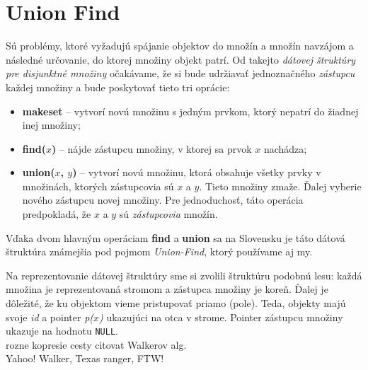 \section{Union Find}
Sú problémy, ktoré vyžadujú spájanie objektov do množín a množín navzájom 
a následné určovanie, do ktorej množiny objekt patrí. Od takejto \emph{
dátovej štruktúry pre disjunktné množiny} očakávame, že si bude udržiavať 
jednoznačného \emph{zástupcu} každej množiny a bude poskytovať 
tieto tri oprácie: 
\begin{itemize}
\item \textbf{makeset} -- vytvorí novú množinu s jedným prvkom, ktorý 
nepatrí do žiadnej inej množiny;
\item \textbf{find($x$)} -- nájde zástupcu množiny, v ktorej sa 
prvok $x$ nachádza;
\item \textbf{union($x$, $y$)} -- vytvorí novú množinu, ktorá obsahuje 
všetky prvky v množinách, ktorých zástupcovia sú $x$ a $y$. Tieto 
množiny zmaže. Ďalej vyberie nového zástupcu novej množiny. Pre 
jednoduchosť, táto operácia predpokladá, že $x$ a $y$ sú 
\emph{zástupcovia} množín.
\end{itemize}
Vďaka dvom hlavným operáciam \textbf{find} a \textbf{union} sa na Slovensku 
je táto dátová štruktúra známejšia pod poj\-mom \emph{Union-Find}, ktorý 
používame aj my. 

Na reprezentovanie dátovej štruktúry sme si zvolili štruktúru podobnú 
lesu: každá množina je reprezentovaná stromom a zástupca množiny je koreň. 
Ďalej je dôležité, že ku objektom vieme pristupovať pria\-mo (pole).
Teda, objekty majú svoje \emph{id} a pointer \emph{p($x$)} 
ukazujúci na otca v strome. Pointer zástupcu množiny ukazuje na 
hodnotu \texttt{NULL}.\\
rozne kopresie cesty
citovat Walkerov alg.
\\
Yahoo! Walker, Texas ranger, FTW!